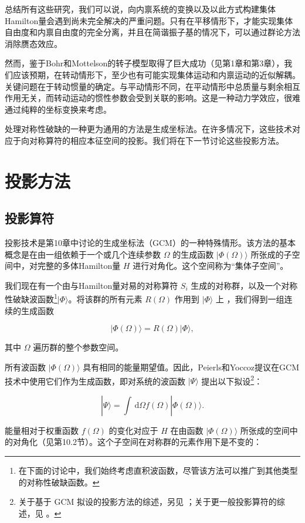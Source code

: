 总结所有这些研究，我们可以说，向内禀系统的变换以及以此方式构建集体Hamilton量会遇到尚未完全解决的严重问题。只有在平移情形下，才能实现集体自由度和内禀自由度的完全分离，并且在简谐振子基的情况下，可以通过群论方法消除赝态效应。

然而，鉴于Bohr和Mottelson的转子模型取得了巨大成功（见第1章和第3章），我们应该预期，在转动情形下，至少也有可能实现集体运动和内禀运动的近似解耦。关键问题在于转动惯量的确定。与平动情形不同，在平动情形中总质量与剩余相互作用无关，而转动运动的惯性参数会受到关联的影响。这是一种动力学效应，很难通过纯粹的坐标变换来考虑。

处理对称性破缺的一种更为通用的方法是生成坐标法。在许多情况下，这些技术对应于向对称算符的相应本征空间的投影。我们将在下一节讨论这些投影方法。

\section{投影方法\label{sec:=006295=005F71=0065B9=006CD5}}

\subsection{投影算符}

投影技术是第10章中讨论的生成坐标法（GCM）的一种特殊情形。该方法的基本概念是在由一组依赖于一个或几个连续参数 $\Omega$
的生成函数 $|\Phi\left(\Omega\right)\rangle$ 所张成的子空间中，对完整的多体Hamilton量
$H$ 进行对角化。这个空间称为“集体子空间”。

我们现在有一个由与Hamilton量对易的对称算符 ${S}_{i}$ 生成的对称群，以及一个对称性破缺波函数\footnote{在下面的讨论中，我们始终考虑直积波函数，尽管该方法可以推广到其他类型的对称性破缺函数。}$|\Phi\rangle$。将该群的所有元素
$R(\Omega)$ 作用到 $|\Phi\rangle$ 上 ，我们得到一组连续的生成函数

\[
|\Phi(\Omega)\rangle=R(\Omega)|\Phi\rangle,\tag{11.52}
\]

其中 $\Omega$ 遍历群的整个参数空间。

所有波函数 $|\Phi\left(\Omega\right)\rangle$ 具有相同的能量期望值。因此，Peierls和Yoccoz\cite{PY57}提议在GCM技术中使用它们作为生成函数，即对系统的波函数
$|\Psi\rangle$ 提出以下拟设\footnote{关于基于 GCM 拟设的投影方法的综述，另见 \cite{Wo75}；关于更一般投影算符的综述，见 \cite{Ma70}。}：

\[
|\Psi\rangle=\int{\,\mathrm{d}\Omega f(\Omega)}|\Phi(\Omega)\rangle.\tag{11.53}
\]

能量相对于权重函数 $f\left(\Omega\right)$ 的变化对应于 $H$ 在由函数 $|\Phi\left(\Omega\right)\rangle$
所张成的空间中的对角化（见第10.2节）。这个子空间在对称群的元素作用下是不变的\cite{Ze67}：

